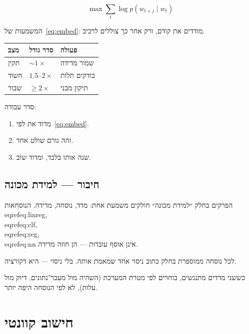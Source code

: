 \begin{equation}
\label{eq:embed}
\max \sum_t \log p(w_{t+j}\mid w_t)
\end{equation}

המשמעות של~\eqref{eq:embed}: מודדים את  קודם, ורק אחר כך צוללים לרכיב.

\begin{tablebox}\centering\small
\begin{tabular}{@{}lll@{}}
\toprule
\textbf{מצב} & \textbf{סדר גודל} & \textbf{פעולה}\\
\midrule
תקין & $\sim 1\times$ & שמור מדידה\\
חשוד & $1.5$–$2\times$ & בודקים תלות\\
שבור & $\ge 2\times$ & תיקון מבני\\
\bottomrule
\end{tabular}
\end{tablebox}

סדר עבודה:
\begin{enumerate}
\item[(\textbf{א})] מדוד את  לפי~\eqref{eq:embed}.
\item[(\textbf{ב})] זהה גורם שולט אחד.
\item[(\textbf{ג})] שנה אותו בלבד, ומדוד שוב.
\end{enumerate}


\chapter{חיבור — למידת מכונה}
\label{ch:bridge-linreg}

הפרקים בחלק ״למידת מכונה״ חולקים משמעת אחת: מדד, נוסחה, מדידה.
הנוסחאות \\eqref{eq:linreg}, \\eqref{eq:clf}, \\eqref{eq:reg}, \\eqref{eq:nn} אינן אוסף עובדות — הן חוזה מדידה.

\begin{keybox}[frametitle={חוזה החלק}]
לכל נוסחה ממוספרת בחלק כתוב ניסוי אחד שמאמת אותה. בלי ניסוי — היא דקורציה.
\end{keybox}

כששני מדדים מתנגשים, בוחרים לפי מטרת המערכת (השהיה מול מעבר־נתונים, דיוק מול עלות),
לא לפי הנוסחה היפה יותר.

\part{חישוב קוונטי}

